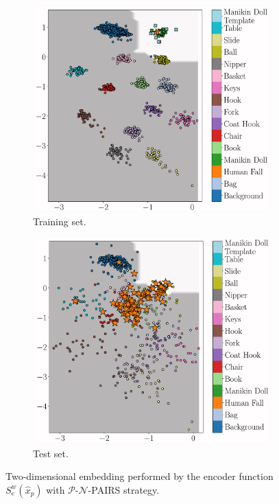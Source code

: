\begin{figure}[h!]
	\centering
	\begin{subfigure}[b]{0.475\textwidth}   
		\centering 
		\includegraphics[width=\textwidth]{img/eeai/embedding/positive_negative_template_pairs/fold_2_train}
		\caption[]%
		{\small Training set.}    
		\label{fig:train-p-n-pairs}
	\end{subfigure}
	\quad
	\begin{subfigure}[b]{0.475\textwidth}   
		\centering 
		\includegraphics[width=\textwidth]{img/eeai/embedding/positive_negative_template_pairs/fold_2_moquette}
		\caption[]%
		{ Test set.}    
		\label{fig:test-p-n-pairs}
	\end{subfigure}
	\caption[]
	{\small Two-dimensional embedding performed by the encoder function $S_e^w(\hat{x}_{p})$ with $\mathcal{P}$-$\mathcal{N}$-PAIRS strategy.} 
	\label{fig:p-n-pairs}
\end{figure}
